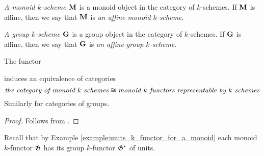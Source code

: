 \begin{definition}
\textit{A monoid $k$-scheme $\mathbf{M}$} is a monoid object in the category of $k$-schemes. If $\mathbf{M}$ is affine, then we say that $\mathbf{M}$ is \textit{an affine monoid $k$-scheme}.
\end{definition}

\begin{definition}
\textit{A group $k$-scheme $\mathbf{G}$} is a group object in the category of $k$-schemes. If $\mathbf{G}$ is affine, then we say that $\mathbf{G}$ is \textit{an affine group $k$-scheme}.
\end{definition}

\begin{corollary}\label{corollary:monoid_k_schemes_and_their_functors_of_points}
The functor
\begin{center}
\end{center}
induces an equivalence of categories
$$\mbox{\emph{the category of monoid $k$-schemes}}\cong \mbox{\emph{monoid $k$-functors representable by $k$-schemes}}$$
Similarly for categories of groups.
\end{corollary}
\begin{proof}
Follows from {\cite[Fact 4.1]{kfunctors}}.
\end{proof}
\noindent
Recall that by Example \ref{example:units_k_functor_for_a_monoid} each monoid $k$-functor ${\mathfrak G}$ has its group $k$-functor ${\mathfrak G}^*$ of units.

